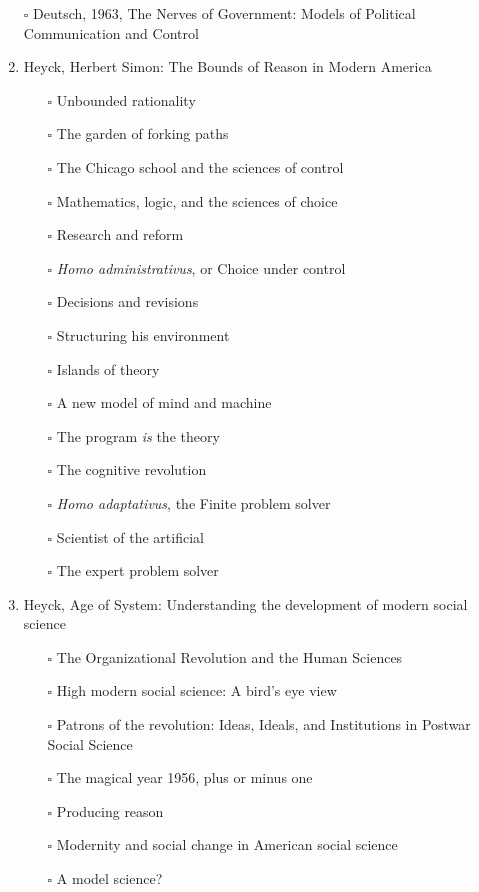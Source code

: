 \documentclass[paper=B6,portrait,twoside=true,twocolumn=false,headinclude=true,footinclude=false,fontsize=12,BCOR=10mm,DIV=calc,pagesize=auto,titlepage=firstiscover,mpinclude=false,headings=normal,headings=twolinechapter,open=right,toc=graduated,chapterprefix=false,numbers=endperiod,parskip=half+]{scrbook}
\theoremstyle{definition}
\begin{document}
\begin{enumerate}
\item[{$\square$}] Deutsch, 1963, The Nerves of Government: Models of Political Communication and Control
\item\relax [0/15] Heyck, Herbert Simon: The Bounds of Reason in Modern America
\begin{itemize}
\item[{$\square$}] Unbounded rationality
\item[{$\square$}] The garden of forking paths
\item[{$\square$}] The Chicago school and the sciences of control
\item[{$\square$}] Mathematics, logic, and the sciences of choice
\item[{$\square$}] Research and reform
\item[{$\square$}] \emph{Homo administrativus}, or Choice under control
\item[{$\square$}] Decisions and revisions
\item[{$\square$}] Structuring his environment
\item[{$\square$}] Islands of theory
\item[{$\square$}] A new model of mind and machine
\item[{$\square$}] The program \emph{is} the theory
\item[{$\square$}] The cognitive revolution
\item[{$\square$}] \emph{Homo adaptativus}, the Finite problem solver
\item[{$\square$}] Scientist of the artificial
\item[{$\square$}] The expert problem solver
\end{itemize}
\item\relax [0/8] Heyck, Age of System: Understanding the development of modern social science
\begin{itemize}
\item[{$\square$}] The Organizational Revolution and the Human Sciences
\item[{$\square$}] High modern social science: A bird's eye view
\item[{$\square$}] Patrons of the revolution: Ideas, Ideals, and Institutions in Postwar Social Science
\item[{$\square$}] The magical year 1956, plus or minus one
\item[{$\square$}] Producing reason
\item[{$\square$}] Modernity and social change in American social science
\item[{$\square$}] A model science?

\end{itemize}
\end{enumerate}
\end{document}
